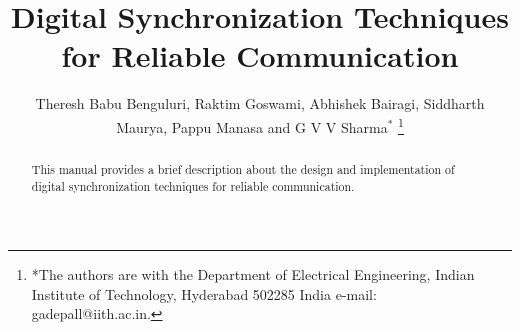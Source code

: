 \documentclass[journal,12pt,twocolumn]{IEEEtran}
\begin{document}


\let\StandardTheFigure\thefigure
\let\StandardTheTable\thetable





\def\putbox#1#2#3{\makebox[0in][l]{\makebox[#1][l]{}\raisebox{\baselineskip}[0in][0in]{\raisebox{#2}[0in][0in]{#3}}}}
     \def\rightbox#1{\makebox[0in][r]{#1}}
     \def\centbox#1{\makebox[0in]{#1}}
     \def\topbox#1{\raisebox{-\baselineskip}[0in][0in]{#1}}
     \def\midbox#1{\raisebox{-0.5\baselineskip}[0in][0in]{#1}}



\title{ 
Digital Synchronization Techniques for Reliable Communication 
}



\author{Theresh Babu Benguluri, Raktim Goswami, Abhishek Bairagi, Siddharth Maurya, Pappu Manasa and G V V 
Sharma$^{*}$%
\thanks{*The authors are with the Department
of Electrical Engineering, Indian Institute of Technology, Hyderabad
502285 India e-mail:  gadepall@iith.ac.in.}
}


\maketitle

\tableofcontents

\bigskip
%
\begin{abstract}
This manual provides a brief description about the design and implementation of digital 
synchronization techniques for reliable communication.
\end{abstract}

%
\end{document}
